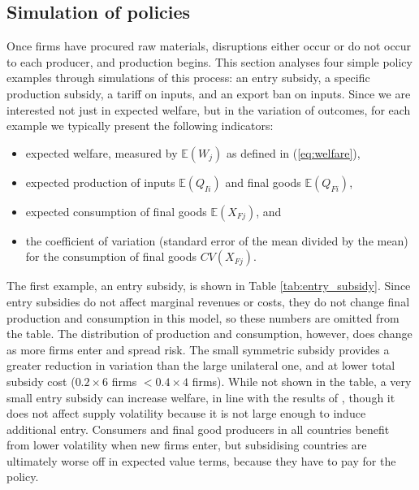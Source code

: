 \documentclass{article}
\begin{document}
\subsection{Simulation of policies}

Once firms have procured raw materials, disruptions either occur or do not occur to each producer, and production begins. This section analyses four simple policy examples through simulations of this process: an entry subsidy, a specific production subsidy, a tariff on inputs, and an export ban on inputs. Since we are interested not just in expected welfare, but in the variation of outcomes, for each example we typically present the following indicators:
\begin{itemize}
    \item expected welfare, measured by $\mathbb{E} (W_{j})$ as defined in (\ref{eq:welfare}), 
    \item expected production of inputs $\mathbb{E} (Q_{Ii})$ and final goods $\mathbb{E} (Q_{Fi})$, 
    \item expected consumption of final goods $\mathbb{E} (X_{Fj})$, and
    \item the coefficient of variation (standard error of the mean divided by the mean) for the consumption of final goods $CV (X_{Fj})$.
\end{itemize}

The first example, an entry subsidy, is shown in Table \ref{tab:entry_subsidy}. Since entry subsidies do not affect marginal revenues or costs, they do not change final production and consumption in this model, so these numbers are omitted from the table. The distribution of production and consumption, however, does change as more firms enter and spread risk. The small symmetric subsidy provides a greater reduction in variation than the large unilateral one, and at lower total subsidy cost ($0.2 \times 6$ firms $< 0.4 \times 4$ firms). While not shown in the table, a very small entry subsidy can increase welfare, in line with the results of \textcite{bagwell_trade_2018}, though it does not affect supply volatility because it is not large enough to induce additional entry. Consumers and final good producers in all countries benefit from lower volatility when new firms enter, but subsidising countries are ultimately worse off in expected value terms, because they have to pay for the policy.
\end{document}

